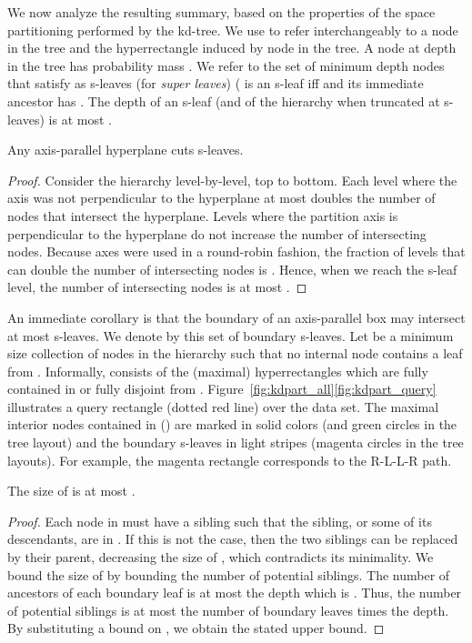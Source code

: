\documentclass[11pt]{article}
\begin{document}
We now analyze the resulting summary, based on the properties of the
space partitioning performed by the kd-tree.
We use  to refer interchangeably to a node in the tree and the  
hyperrectangle induced by node  in the tree.  
A node  at depth  in the tree has probability mass
  .
 We refer to the set of minimum depth nodes that satisfy 
 as s-leaves (for {\em super leaves})
( is an s-leaf iff  and its immediate ancestor
  has .  
The depth of an s-leaf (and of the hierarchy when truncated at
s-leaves) is at most .
\begin{lemma}
Any axis-parallel 
hyperplane cuts  s-leaves.  
\label{lem:bsize}
\end{lemma}
\begin{proof}
Consider the hierarchy level-by-level, top to bottom.  
Each level where the axis was not perpendicular to the hyperplane at most
 doubles the number of nodes that intersect the hyperplane. 
Levels where the partition axis is perpendicular to the hyperplane do not
increase the number of intersecting nodes.
Because axes were used in a round-robin fashion, 
the fraction of levels that can double the number of intersecting nodes 
is .
Hence, when we reach the s-leaf level, 
the number of intersecting nodes is at most  
.
\end{proof}
An immediate corollary is that
the boundary of an axis-parallel box  may intersect at most  s-leaves. We denote by  this set of
boundary s-leaves. 
 Let  be a minimum size collection of nodes in the hierarchy 
such that no internal node contains a leaf from . 
Informally,  consists of the (maximal) hyperrectangles which
are fully contained in  or fully disjoint from .
Figure~\ref{fig:kdpart_all}\ref{fig:kdpart_query} illustrates a query rectangle  (dotted red line) over the data set.
The maximal interior nodes contained in   
() are marked in solid
colors (and green circles in the tree layout) and the boundary s-leaves  in light stripes (magenta circles in the tree layouts).
For example, the magenta rectangle corresponds to the R-L-L-R path.
\begin{lemma}
\label{lem:usize}
The size of  is at most
 .
\end{lemma}
\begin{proof}
  Each node in  must have a 
sibling such that the sibling, or some of its descendants, are in .
If this is not the case, then the two siblings can be replaced by their parent, decreasing the size of , which contradicts its minimality.
We bound the size of  by bounding the number of potential siblings.
The number of ancestors of each boundary leaf is at most the depth 
which is .  Thus, 
the number of potential siblings is at most the number of boundary leaves times the depth.  By substituting a bound on , we obtain the stated upper bound.
\end{proof}
\end{document}

